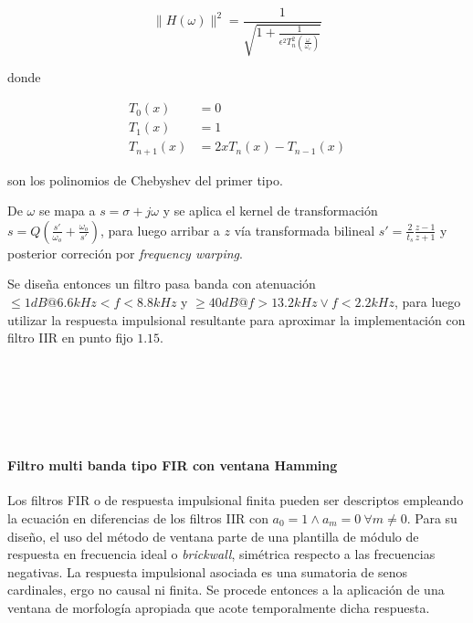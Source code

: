 \documentclass[11pt]{article}
\begin{document}
\[
\|H(\omega)\|^2 = \frac{1}{\sqrt{1 + \frac{1}{\epsilon^2 T^2_n(\frac{\omega}{\omega_c})}}}
\]

donde


\begin{align}
T_0(x) &= 0 \\
T_1(x) &= 1 \\
T_{n+1}(x) &= 2x T_n(x) - T_{n-1}(x)
\end{align}


son los polinomios de Chebyshev del primer tipo.

De \(\omega\) se mapa a \(s = \sigma + j\omega\) y se aplica el kernel
de transformación \(s = Q (\frac{s'}{\omega_o} + \frac{\omega_o}{s'})\),
para luego arribar a \(z\) vía transformada bilineal
\(s' = \frac{2}{t_s} \frac{z - 1}{z + 1}\) y posterior correción por
\emph{frequency warping}.

Se diseña entonces un filtro pasa banda con atenuación
\(\leq 1 dB @ 6.6 kHz < f < 8.8 kHz\) y
\(\geq 40 dB @ f > 13.2 kHz \lor f < 2.2 kHz\), para luego utilizar la
respuesta impulsional resultante para aproximar la implementación con
filtro IIR en punto fijo \(1.15\).


    \begin{center}
    \end{center}
    { \hspace*{\fill} \\}
    

    \begin{center}
    \end{center}
    { \hspace*{\fill} \\}
    

    \begin{center}
    \end{center}
    { \hspace*{\fill} \\}
    
    \paragraph{Filtro multi banda tipo FIR con ventana
Hamming}\label{filtro-multi-banda-tipo-fir-con-ventana-hamming}

Los filtros FIR o de respuesta impulsional finita pueden ser descriptos
empleando la ecuación en diferencias de los filtros IIR con
\(a_0 = 1 \land a_m = 0\ \forall m \neq 0\). Para su diseño, el uso del
método de ventana parte de una plantilla de módulo de respuesta en
frecuencia ideal o \emph{brickwall}, simétrica respecto a las
frecuencias negativas. La respuesta impulsional asociada es una
sumatoria de senos cardinales, ergo no causal ni finita. Se procede
entonces a la aplicación de una ventana de morfología apropiada que
acote temporalmente dicha respuesta.
\end{document}
